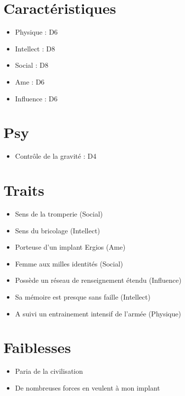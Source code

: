\begin{multicols}{2}

\section*{Caractéristiques}

\begin{itemize}
\item Physique : D6
\item Intellect : D8
\item Social : D8
\item Ame : D6
\item Influence : D6
\end{itemize}

\section*{Psy}

\begin{itemize}
\item Contrôle de la gravité : D4
\end{itemize}

\section*{Traits}

\begin{itemize}
\item Sens de la tromperie (Social)
\item Sens du bricolage (Intellect)
\item Porteuse d'un implant Ergios (Ame)
\item Femme aux milles identités (Social)
\item Possède un réseau de renseignement étendu (Influence)
\item Sa mémoire est presque sans faille (Intellect)
\item A suivi un entrainement intensif de l'armée (Physique)
\end{itemize}

\section*{Faiblesses}

\begin{itemize}
\item Paria de la civilisation
\item De nombreuses forces en veulent à mon implant
\end{itemize}


\end{multicols}

